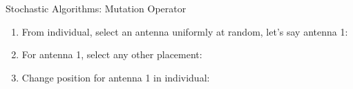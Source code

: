 \documentclass{beamer}
\begin{document}
\begin{frame}[t]{Stochastic Algorithms: Mutation Operator}
    \begin{enumerate}
        \item From individual, select an antenna uniformly at random, let's say antenna 1:\par
            \begin{minipage}[t]{\linewidth}
                \centering
            \end{minipage}
        \item For antenna 1, select any other placement:\par
            \begin{minipage}[t]{\linewidth}
                \centering
            \end{minipage}
        \item Change position for antenna 1 in individual:\par
            \begin{minipage}[t]{\linewidth}
                \centering
            \end{minipage}
    \end{enumerate}
\end{frame}
\end{document}
